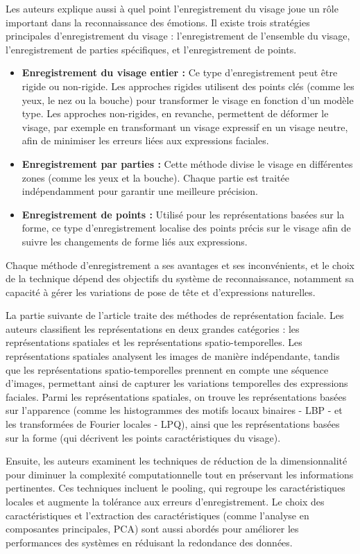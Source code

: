 \documentclass{rapport}
\begin{document}
Les auteurs explique aussi à quel point l'enregistrement du visage joue un rôle
important dans la reconnaissance des émotions. Il existe trois stratégies 
principales d'enregistrement du visage : l'enregistrement de l’ensemble du visage, 
l’enregistrement de parties spécifiques, et l’enregistrement de points.
\begin{itemize}
    \item \textbf{Enregistrement du visage entier :} Ce type d’enregistrement peut être rigide ou 
non-rigide. Les approches rigides utilisent des points clés (comme les yeux, 
le nez ou la bouche) pour transformer le visage en fonction d’un modèle type. 
Les approches non-rigides, en revanche, permettent de déformer le visage, par 
exemple en transformant un visage expressif en un visage neutre, afin de minimiser 
les erreurs liées aux expressions faciales.
    \item \textbf{Enregistrement par parties :} Cette méthode divise le visage 
en différentes zones (comme les yeux et la bouche). Chaque partie 
est traitée indépendamment pour garantir une meilleure précision.
    \item \textbf{Enregistrement de points :} Utilisé pour les représentations 
basées sur la forme, ce type d'enregistrement localise des points 
précis sur le visage afin de suivre les changements de forme liés 
aux expressions.
\end{itemize}
Chaque méthode d'enregistrement a ses avantages et ses inconvénients, et le choix 
de la technique dépend des objectifs du système de reconnaissance, notamment sa 
capacité à gérer les variations de pose de tête et d'expressions naturelles.

La partie suivante de l'article traite des méthodes de représentation faciale. 
Les auteurs classifient les représentations en deux grandes catégories : les 
représentations spatiales et les représentations spatio-temporelles. Les 
représentations spatiales analysent les images de manière indépendante, tandis que 
les représentations spatio-temporelles prennent en compte une séquence d'images, 
permettant ainsi de capturer les variations temporelles des expressions faciales. 
Parmi les représentations spatiales, on trouve les représentations basées sur 
l'apparence (comme les histogrammes des motifs locaux binaires - LBP - et les 
transformées de Fourier locales - LPQ), ainsi que les représentations basées sur la 
forme (qui décrivent les points caractéristiques du visage).

Ensuite, les auteurs examinent les techniques de réduction de la dimensionnalité 
pour diminuer la complexité computationnelle tout en préservant les informations 
pertinentes. Ces techniques incluent le pooling, qui regroupe les caractéristiques 
locales et augmente la tolérance aux erreurs d'enregistrement. Le choix des 
caractéristiques et l'extraction des caractéristiques (comme l'analyse en 
composantes principales, PCA) sont aussi abordés pour améliorer les performances 
des systèmes en réduisant la redondance des données.
\end{document}
